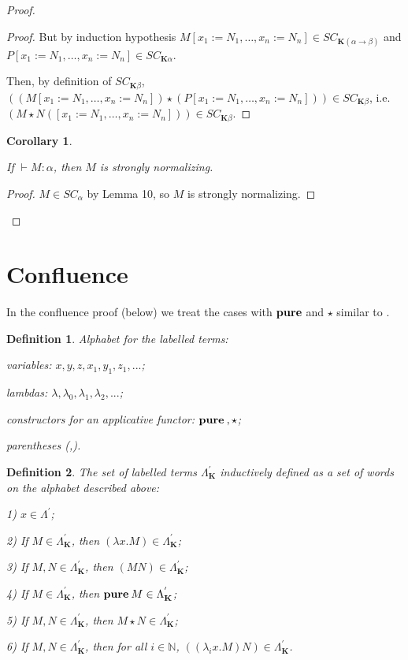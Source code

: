 \documentclass[a4paper]{article}
\newtheorem{defin}{Definition}
\newtheorem{col}{Corollary}
\begin{document}
\begin{proof}
\begin{proof}
  But by induction hypothesis $M [x_1 := N_1, \dots, x_n := N_n] \in SC_{\textbf{K}(\alpha \to
  \beta)}$ and $P [x_1 := N_1, \dots, x_n := N_n] \in SC_{\textbf{K}\alpha}$.

  Then, by definition of $SC_{\textbf{K}\beta}$, $((M [x_1 := N_1, \dots, x_n := N_n]) \star (P [x_1 := N_1, \dots, x_n := N_n])) \in SC_{\textbf{K}\beta}$, i.e. $(M \star N ([x_1 := N_1, \dots, x_n := N_n])) \in
  SC_{\textbf{K}\beta}$.
  \end{proof}

  \begin{col}

  $ $

  If $\vdash M : \alpha$, then $M$ is strongly normalizing.

  \end{col}

  \begin{proof}

  $M \in SC_{\alpha}$ by Lemma 10, so $M$ is strongly normalizing.

  \end{proof}


  \end{proof}

\section{Confluence}

In the confluence proof (below) we treat the cases with ${\bf pure}$ and $\star$ similar to \cite{Baren} \cite{Baren2}.

\begin{defin} Alphabet for the labelled terms:

variables: $x, y, z, x_1, y_1, z_1, ...$;

lambdas: $\lambda, \lambda_0, \lambda_1, \lambda_2, ...$;

constructors for an applicative functor: ${\bf pure \: }, \star$;

parentheses (,).

\end{defin}

\begin{defin} The set of labelled terms $\Lambda^{'}_{\textbf{K}}$ inductively defined as a set of words on the alphabet
described above:

1) $x \in \Lambda^{'}$;

2) If $M \in \Lambda^{'}_{\textbf{K}}$, then $(\lambda x. M) \in \Lambda^{'}_{\textbf{K}}$;

3) If $M, N \in \Lambda^{'}_{\textbf{K}}$, then $(MN) \in \Lambda^{'}_{\textbf{K}}$;

4) If $M \in \Lambda^{'}_{\textbf{K}}$, then ${\bf pure \: } M \in \Lambda^{'}_{\textbf{K}}$;

5) If $M, N \in \Lambda^{'}_{\textbf{K}}$, then $M \star N \in \Lambda^{'}_{\textbf{K}}$;

6) If $M, N \in \Lambda^{'}_{\textbf{K}}$, then for all $i \in \mathbb{N}$, $((\lambda_i x. M) N) \in
\Lambda^{'}_{\textbf{K}}$.

\end{defin}
\end{document}
